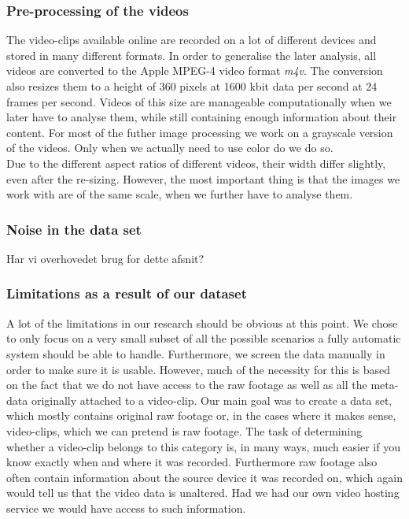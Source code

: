 \subsubsection{Pre-processing of the videos}
%
The video-clips available online are recorded on a lot of different devices and stored in many different formats. In order to generalise the later analysis, all videos are converted to the Apple MPEG-4 video format \textit{m4v}. The conversion also resizes them to a height of 360 pixels at 1600 kbit data per second at 24 frames per second. Videos of this size are manageable computationally when we later have to analyse them, while still containing enough information about their content. For most of the futher image processing we work on a grayscale version of the videos. Only when we actually need to use color do we do so.\\
Due to the different aspect ratios of different videos, their width differ slightly, even after the re-sizing. However, the most important thing is that the images we work with are of the same scale, when we further have to analyse them.
%
\subsubsection{Noise in the data set}
%
Har vi overhovedet brug for dette afsnit?
%
\subsubsection{Limitations as a result of our dataset}
%
%
A lot of the limitations in our research should be obvious at this point. We chose to only focus on a very small subset of all the possible scenarios a fully automatic system should be able to handle. Furthermore, we screen the data manually in order to make sure it is usable. However, much of the necessity for this is based on the fact that we do not have access to the raw footage as well as all the meta-data originally attached to a video-clip. Our main goal was to create a data set, which mostly contains original raw footage or, in the cases where it makes sense, video-clips, which we can pretend is raw footage. The task of determining whether a video-clip belongs to this category is, in many ways, much easier if you know exactly when and where it was recorded. Furthermore raw footage also often contain information about the source device it was recorded on, which again would tell us that the video data is unaltered. Had we had our own video hosting service we would have access to such information.
%